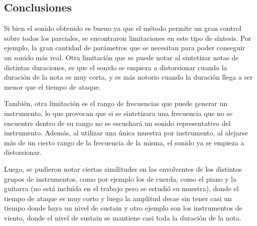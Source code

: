 \documentclass[assd_tp2_main.tex]{subfiles}
\begin{document}
\subsection{Conclusiones}

Si bien el sonido obtenido es bueno ya que el método permite un gran control sobre todos los parciales, se encontraron limitaciones en este tipo de síntesis. Por ejemplo, la gran cantidad de parámetros que se necesitan para poder conseguir un sonido más real. Otra limitación que se puede notar al sintetizar notas de distintas duraciones, es que el sonido se empieza a distorsionar cuando la duración de la nota es muy corta, y es más notorio cuando la duración llega a ser menor que el tiempo de ataque.

También, otra limitación es el rango de frecuencias que puede generar un instrumento, lo que provocan que si se sintetizara una frecuencia que no se encuentre dentro de su rango no se escuchará un sonido representativo del instrumento. Además, al utilizar una única muestra por instrumento, al alejarse más de un cierto rango de la frecuencia de la misma, el sonido ya se empieza a distorsionar.

Luego, se pudieron notar ciertas similitudes en las envolventes de los distintos grupos de instrumentos, como por ejemplo los de cuerda, como el piano y la guitarra (no está incluída en el trabajo pero se estudió su muestra), donde el tiempo de ataque es muy corto y luego la amplitud decae sin tener casi un tiempo donde haya un nivel de sustain y otro ejemplo son los instrumentos de viento, donde el nivel de sustain se mantiene casi toda la duración de la nota.
\end{document}
